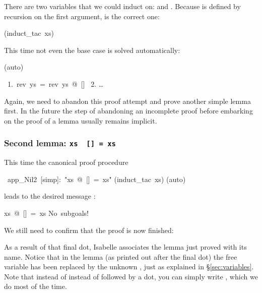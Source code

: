 \begin{isabelle}
\begin{isamarkuptxt}
There are two variables that we could induct on:  and
. Because \isa{\at} is defined by recursion on
the first argument,  is the correct one:%
\end{isamarkuptxt}%
(induct\_tac\ xs)%
\begin{isamarkuptxt}%
\noindent
This time not even the base case is solved automatically:%
\end{isamarkuptxt}%
(auto)%
\begin{isamarkuptxt}%
\begin{isabellepar}%
~1.~rev~ys~=~rev~ys~@~[]\isanewline
~2. \dots
\end{isabellepar}%
Again, we need to abandon this proof attempt and prove another simple lemma first.
In the future the step of abandoning an incomplete proof before embarking on
the proof of a lemma usually remains implicit.%
\end{isamarkuptxt}%
%
\begin{isamarkuptext}%
\subsubsection*{Second lemma: \texttt{xs \at~[] = xs}}

This time the canonical proof procedure%
\end{isamarkuptext}%
\ app\_Nil2\ [simp]:\ {"}xs\ @\ []\ =\ xs{"}\isanewline
{}(induct\_tac\ xs)\isanewline
{}(auto)%
\begin{isamarkuptxt}%
\noindent
leads to the desired message :
\begin{isabellepar}%
xs~@~[]~=~xs\isanewline
No~subgoals!
\end{isabellepar}%

We still need to confirm that the proof is now finished:%
\end{isamarkuptxt}%
%
\begin{isamarkuptext}%
\noindent{}%
As a result of that final dot, Isabelle associates the lemma
just proved with its name. Notice that in the lemma  (as
printed out after the final dot) the free variable  has been
replaced by the unknown , just as explained in
\S\ref{sec:variables}. Note that instead of instead of 
followed by a dot, you can simply write ,
which we do most of the time.


\end{isamarkuptext}
\end{isabelle}

